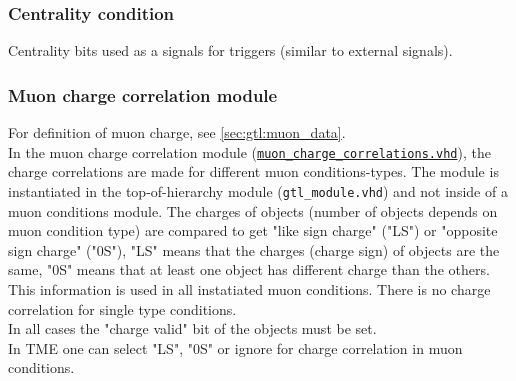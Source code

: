 \subsubsection{Centrality condition}
\label{sec:gtl:centrality_cond}

Centrality bits used as a signals for triggers (similar to external signals).

\subsubsection{Muon charge correlation module}
\label{sec:gtl:muon_charge_correlation_module}

For definition of muon charge, see \ref{sec:gtl:muon_data}.\\
In the muon charge correlation module (\href{https://github.com/cms-l1-globaltrigger/mp7_ugt_legacy/tree/master/firmware/hdl/gt_mp7_core/gtl_fdl_wrapper/gtl/muon_charge_correlations.vhd}{\texttt{muon\_charge\_correlations.vhd}}), the charge correlations are made for different muon conditions-types. The module is instantiated in the top-of-hierarchy module (\texttt{gtl\_module.vhd})
and not inside of a muon conditions module.
The charges of objects (number of objects depends on muon condition type) are compared to get "like sign charge" ("LS") or "opposite sign charge" ("0S"), "LS" means that the charges (charge sign)
of objects are the same, "0S" means that at least one object has different charge than the others. This information is used in all instatiated muon conditions.
There is no charge correlation for single type conditions.\\
In all cases the "charge valid" bit of the objects must be set.\\
In TME one can select "LS", "0S" or ignore for charge correlation in muon conditions.\\

%
%
%
%
%
%

